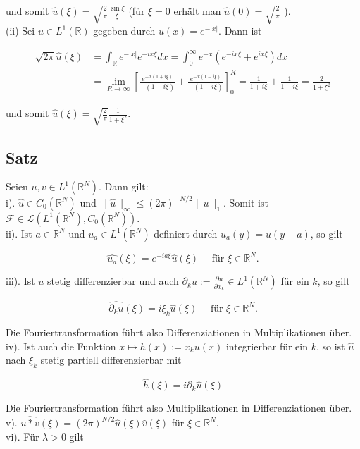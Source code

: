 \documentclass[10pt, letterpaper]{article}
\begin{document}
und somit $\hat{u}(\xi)=\sqrt{\frac{2}{\pi}} \frac{\sin \xi}{\xi}$ (für $\xi=0$ erhält man $\hat{u}(0)=\sqrt{\frac{2}{\pi}}$ ).\\
(ii) Sei $u \in L^{1}(\mathbb{R})$ gegeben durch $u(x)=e^{-|x|}$. Dann ist

$$
\begin{aligned}
\sqrt{2 \pi} \hat{u}(\xi) & =\int_{\mathbb{R}} e^{-|x|} e^{-i x \xi} d x=\int_{0}^{\infty} e^{-x}\left(e^{-i x \xi}+e^{i x \xi}\right) d x \\
& =\lim _{R \rightarrow \infty}\left[\frac{e^{-x(1+i \xi)}}{-(1+i \xi)}+\frac{e^{-x(1-i \xi)}}{-(1-i \xi)}\right]_{0}^{R}=\frac{1}{1+i \xi}+\frac{1}{1-i \xi}=\frac{2}{1+\xi^{2}}
\end{aligned}
$$

und somit $\hat{u}(\xi)=\sqrt{\frac{2}{\pi}} \frac{1}{1+\xi^{2}}$.

\subsection*{Satz}
Seien $u, v \in L^{1}\left(\mathbb{R}^{N}\right)$. Dann gilt:\\
i). $\hat{u} \in C_{0}\left(\mathbb{R}^{N}\right)$ und $\|\hat{u}\|_{\infty} \leq(2 \pi)^{-N / 2}\|u\|_{1}$. Somit ist $\mathcal{F} \in \mathcal{L}\left(L^{1}\left(\mathbb{R}^{N}\right), C_{0}\left(\mathbb{R}^{N}\right)\right)$.\\
ii). Ist $a \in \mathbb{R}^{N}$ und $u_{a} \in L^{1}\left(\mathbb{R}^{N}\right)$ definiert durch $u_{a}(y)=u(y-a)$, so gilt

$$
\widehat{u_{a}}(\xi)=e^{-i a \xi} \hat{u}(\xi) \quad \text { für } \xi \in \mathbb{R}^{N} .
$$

iii). Ist $u$ stetig differenzierbar und auch $\partial_{k} u:=\frac{\partial u}{\partial x_{k}} \in L^{1}\left(\mathbb{R}^{N}\right)$ für ein $k$, so gilt

$$
\widehat{\partial_{k} u}(\xi)=i \xi_{k} \hat{u}(\xi) \quad \text { für } \xi \in \mathbb{R}^{N} .
$$

Die Fouriertransformation führt also Differenziationen in Multiplikationen über.\\
iv). Ist auch die Funktion $x \mapsto h(x):=x_{k} u(x)$ integrierbar für ein $k$, so ist $\hat{u}$ nach $\xi_{k}$ stetig partiell differenzierbar mit

$$
\hat{h}(\xi)=i \partial_{k} \hat{u}(\xi)
$$

Die Fouriertransformation führt also Multiplikationen in Differenziationen über.\\
v). $\widehat{u * v}(\xi)=(2 \pi)^{N / 2} \hat{u}(\xi) \hat{v}(\xi)$ für $\xi \in \mathbb{R}^{N}$.\\
vi). Für $\lambda>0$ gilt
\end{document}
